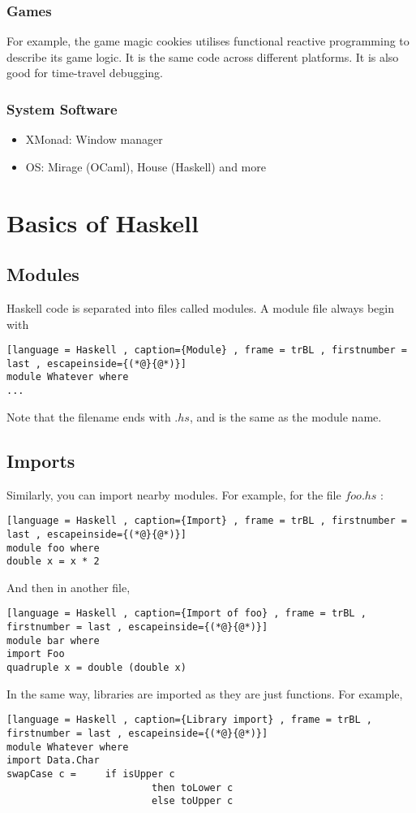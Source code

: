 \documentclass[a4paper]{article}
\theoremstyle{plain}
\theoremstyle{definition}
\theoremstyle{remark}
\begin{document}
\subsubsection{Games}
For example, the game magic cookies utilises functional reactive programming to describe its game logic. It is the same code across different platforms. It is also good for time-travel debugging.
\subsubsection{System Software}
\begin{itemize}
	\item XMonad: Window manager
	\item OS: Mirage (OCaml), House (Haskell) and more
\end{itemize}
\section{Basics of Haskell}
\subsection{Modules}
Haskell code is separated into files called modules. A module file always begin with
\begin{lstlisting}[language = Haskell , caption={Module} , frame = trBL , firstnumber = last , escapeinside={(*@}{@*)}]
module Whatever where
...
\end{lstlisting}
Note that the filename ends with $.hs$, and is the same as the module name.
\subsection{Imports}
Similarly, you can import nearby modules. For example, for the file $foo.hs$ :
\begin{lstlisting}[language = Haskell , caption={Import} , frame = trBL , firstnumber = last , escapeinside={(*@}{@*)}]
module foo where
double x = x * 2
\end{lstlisting}
And then in another file,
\begin{lstlisting}[language = Haskell , caption={Import of foo} , frame = trBL , firstnumber = last , escapeinside={(*@}{@*)}]
module bar where
import Foo
quadruple x = double (double x)
\end{lstlisting}
In the same way, libraries are imported as they are just functions. For example,
\begin{lstlisting}[language = Haskell , caption={Library import} , frame = trBL , firstnumber = last , escapeinside={(*@}{@*)}]
module Whatever where
import Data.Char
swapCase c =	 if isUpper c
					     then toLower c
				    	 else toUpper c
\end{lstlisting}
\end{document}
